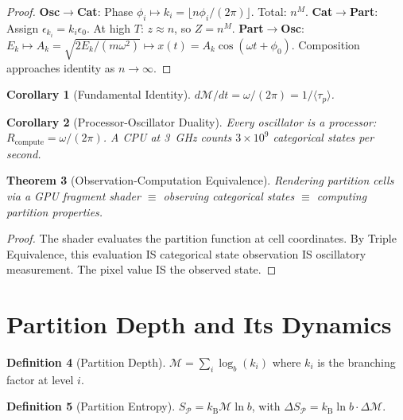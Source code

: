 \documentclass[11pt,twocolumn,a4paper]{article}
\newtheorem{theorem}{Theorem}[section]
\newtheorem{corollary}[theorem]{Corollary}
\theoremstyle{definition}
\newtheorem{definition}[theorem]{Definition}
\theoremstyle{remark}
\newcommand{\kB}{k_{\mathrm{B}}}
\newcommand{\Depth}{\mathcal{M}}
\newcommand{\taup}{\tau_p}
\begin{document}
\begin{proof}
\textbf{Osc$\to$Cat}: Phase $\phi_i \mapsto k_i = \lfloor n\phi_i/(2\pi)\rfloor$. Total: $n^M$. \textbf{Cat$\to$Part}: Assign $\epsilon_{k_i} = k_i\epsilon_0$. At high $T$: $z \approx n$, so $Z = n^M$. \textbf{Part$\to$Osc}: $E_k \mapsto A_k = \sqrt{2E_k/(m\omega^2)} \mapsto x(t) = A_k\cos(\omega t + \phi_0)$. Composition approaches identity as $n \to \infty$.
\end{proof}

\begin{corollary}[Fundamental Identity]
\label{cor:fundamental}
$d\Depth/dt = \omega/(2\pi) = 1/\langle\taup\rangle$.
\end{corollary}

\begin{corollary}[Processor-Oscillator Duality]
Every oscillator is a processor: $R_{\mathrm{compute}} = \omega/(2\pi)$. A CPU at 3~GHz counts $3\times 10^9$ categorical states per second.
\end{corollary}

\begin{theorem}[Observation-Computation Equivalence]
\label{thm:obs_comp}
Rendering partition cells via a GPU fragment shader $\equiv$ observing categorical states $\equiv$ computing partition properties.
\end{theorem}

\begin{proof}
The shader evaluates the partition function at cell coordinates. By Triple Equivalence, this evaluation IS categorical state observation IS oscillatory measurement. The pixel value IS the observed state.
\end{proof}

\section{Partition Depth and Its Dynamics}
\label{sec:depth}

\begin{definition}[Partition Depth]
$\Depth = \sum_{i} \log_b(k_i)$ where $k_i$ is the branching factor at level $i$.
\end{definition}

\begin{definition}[Partition Entropy]
$S_{\mathcal{P}} = \kB \Depth \ln b$, with $\Delta S_{\mathcal{P}} = \kB \ln b \cdot \Delta\Depth$.
\end{definition}
\end{document}

